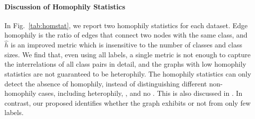 \paragraph{Discussion of Homophily Statistics}
In Fig.~\ref{tab:homstat}, we report two homophily statistics for each dataset.
Edge homophily \cite{zhu2020beyond} is the ratio of edges that connect two nodes with the same class, and $\hat{h}$ \cite{lim2021large} is an improved metric which is insensitive to the number of classes and class sizes.
We find that, even using all labels, a single metric is not enough to capture the interrelations of all class pairs in detail, and the graphs with low homophily statistics are not guaranteed to be heterophily.
The homophily statistics can only detect the absence of homophily, instead of distinguishing different non-homophily cases, including heterophily, \xophily, and no \nef.
This is also discussed in \cite{lim2021large}.
In contrast, our proposed \methodtest identifies whether the graph exhibits \nef or not from only few labels.
